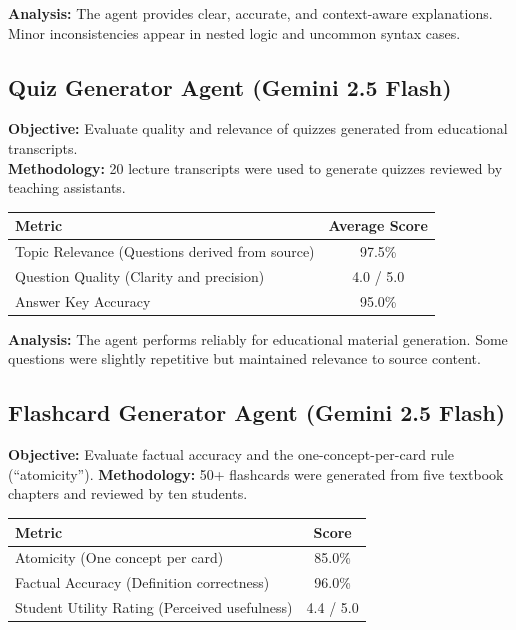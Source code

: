\documentclass[12pt,a4paper]{article}
\begin{document}
\textbf{Analysis:} The agent provides clear, accurate, and context-aware explanations. Minor inconsistencies appear in nested logic and uncommon syntax cases.

\subsection{Quiz Generator Agent (Gemini 2.5 Flash)}
\textbf{Objective:} Evaluate quality and relevance of quizzes generated from educational transcripts.\\\textbf{Methodology:} 20 lecture transcripts were used to generate quizzes reviewed by teaching assistants.

\begin{table}[H]
\centering
\begin{tabular}{lc}
\toprule
\textbf{Metric} & \textbf{Average Score} \\
\midrule
Topic Relevance (Questions derived from source) & 97.5\% \\
Question Quality (Clarity and precision) & 4.0 / 5.0 \\
Answer Key Accuracy & 95.0\% \\
\bottomrule
\end{tabular}
\end{table}

\textbf{Analysis:} The agent performs reliably for educational material generation. Some questions were slightly repetitive but maintained relevance to source content.

\subsection{Flashcard Generator Agent (Gemini 2.5 Flash)}
\textbf{Objective:} Evaluate factual accuracy and the one-concept-per-card rule (“atomicity”).
\textbf{Methodology:} 50+ flashcards were generated from five textbook chapters and reviewed by ten students.

\begin{table}[H]
\centering
\begin{tabular}{lc}
\toprule
\textbf{Metric} & \textbf{Score} \\
\midrule
Atomicity (One concept per card) & 85.0\% \\
Factual Accuracy (Definition correctness) & 96.0\% \\
Student Utility Rating (Perceived usefulness) & 4.4 / 5.0 \\
\bottomrule
\end{tabular}
\end{table}
\end{document}
